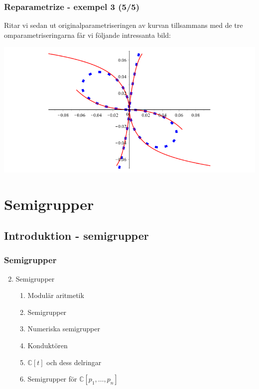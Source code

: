 \documentclass{beamer}
\begin{document}
\begin{frame}
	\frametitle{Reparametrize - exempel 3 (5/5)}
	
	\begin{example}
		Ritar vi sedan ut originalparametriseringen av kurvan tillsammans med de tre omparametriseringarna får vi följande intressanta bild:

		\begin{center}
			\includegraphics[scale=0.35]{Export/kurvorplot2d3.png}
		\end{center}
	\end{example}
\end{frame}








\section{Semigrupper}
\subsection{Introduktion - semigrupper}


\begin{frame}
	\frametitle{Semigrupper}
	\begin{enumerate}
		\setcounter{enumi}{1}
		\item<1-> Semigrupper
		\begin{enumerate}
			\item<2-> Modulär aritmetik
			\item<3-> Semigrupper
			\item<4-> Numeriska semigrupper
			\item<5-> Konduktören
			\item<6-> $\mathbb{C}[t]$ och dess delringar
			\item<7-> Semigrupper för $\mathbb{C}[p_1,\ldots,p_n]$
		\end{enumerate}
	\end{enumerate}
\end{frame}
\end{document}
